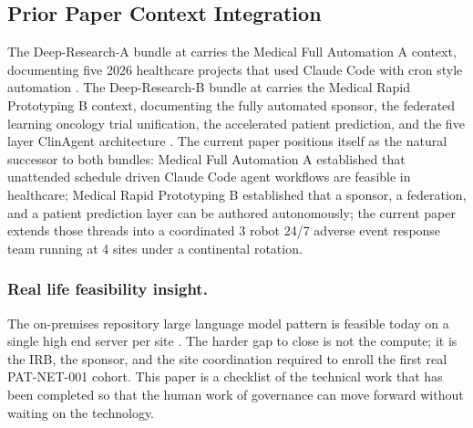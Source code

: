 \begin{sectionaccent}
\subsection{Prior Paper Context Integration}
\label{sec:discussion-prior}

The Deep-Research-A bundle at
 carries the Medical Full
Automation A context, documenting five 2026 healthcare projects
that used Claude Code with cron style automation
\cite{vinkius2026clinicaltrials, feld2026curecancermagic,
ship2026doctor, anthropic_routines_2026}. The Deep-Research-B bundle
at  carries the Medical Rapid
Prototyping B context, documenting the fully automated sponsor, the
federated learning oncology trial unification, the accelerated
patient prediction, and the five layer ClinAgent architecture
\cite{kawchak2026sponsor, kawchak2026federated, kawchak2026prediction,
yan2026clinagent, anthropic2026lifesciences}. The current paper
positions itself as the natural successor to both bundles: Medical
Full Automation A established that unattended schedule driven Claude
Code agent workflows are feasible in healthcare; Medical Rapid
Prototyping B established that a sponsor, a federation, and a
patient prediction layer can be authored autonomously; the current
paper extends those threads into a coordinated 3 robot 24/7 adverse
event response team running at 4 sites under a continental rotation.

\subsubsection*{Real life feasibility insight.} The on-premises
repository large language model pattern is feasible today on a
single high end server per site
\cite{anthropic_claude_opus_47_2026, unitree_h2_2026}. The harder gap
to close is not the compute; it is the IRB, the sponsor, and the site
coordination required to enroll the first real PAT-NET-001 cohort.
This paper is a checklist of the technical work that has been
completed so that the human work of governance can move forward
without waiting on the technology.


\end{sectionaccent}
